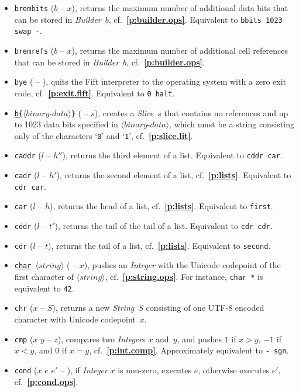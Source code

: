\documentclass[12pt,oneside]{article}
\def\refpoint#1{{\rm\textbf{\ref{#1}}}}
\let\ptref=\refpoint
\begin{document}
\begin{itemize}
\item {\tt brembits} ($b$ -- $x$), returns the maximum number of additional data bits that can be stored in {\em Builder\/}~$b$, cf.~\ptref{p:builder.ops}. Equivalent to {\tt bbits 1023 swap -}.
\item {\tt bremrefs} ($b$ -- $x$), returns the maximum number of additional cell references that can be stored in {\em Builder\/}~$b$, cf.~\ptref{p:builder.ops}.
\item {\tt bye} ( -- ), quits the Fift interpreter to the operating system with a zero exit code, cf.~\ptref{p:exit.fift}. Equivalent to {\tt 0 halt}.
\item {\tt \underline{b\{}$\langle\textit{binary-data}\rangle$\}} ( -- $s$), creates a {\em Slice}~$s$ that contains no references and up to 1023 data bits specified in $\langle\textit{binary-data}\rangle$, which must be a string consisting only of the characters `{\tt 0}' and `{\tt 1}', cf.~\ptref{p:slice.lit}.
\item {\tt caddr} ($l$ -- $h''$), returns the third element of a list. Equivalent to {\tt cddr car}.
\item {\tt cadr} ($l$ -- $h'$), returns the second element of a list, cf.~\ptref{p:lists}. Equivalent to {\tt cdr car}.
\item {\tt car} ($l$ -- $h$), returns the head of a list, cf.~\ptref{p:lists}. Equivalent to {\tt first}.
\item {\tt cddr} ($l$ -- $t'$), returns the tail of the tail of a list. Equivalent to {\tt cdr cdr}.
\item {\tt cdr} ($l$ -- $t$), returns the tail of a list, cf.~\ptref{p:lists}. Equivalent to {\tt second}.
\item {\tt \underline{char} $\langle\textit{string}\rangle$} ( -- $x$), pushes an {\em Integer\/} with the Unicode codepoint of the first character of {\tt $\langle\textit{string}\rangle$}, cf.~\ptref{p:string.ops}. For instance, {\tt char *} is equivalent to {\tt 42}.
\item {\tt chr} ($x$ -- $S$), returns a new {\em String\/}~$S$ consisting of one UTF-8 encoded character with Unicode codepoint~$x$.
\item {\tt cmp} ($x$ $y$ -- $z$), compares two {\em Integer\/}s $x$ and~$y$, and pushes $1$ if $x>y$, $-1$ if $x<y$, and $0$ if $x=y$, cf.~\ptref{p:int.comp}. Approximately equivalent to {\tt - sgn}.
\item {\tt cond} ($x$ $e$ $e'$ -- ), if {\em Integer\/} $x$ is non-zero, executes $e$, otherwise executes $e'$, cf.~\ptref{p:cond.ops}.

\end{itemize}
\end{document}
